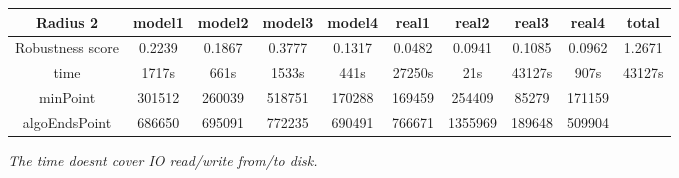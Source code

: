 \documentclass{article}
\begin{document}
\begin{table}[]
\begin{adjustwidth}{-1cm}{}
\begin{threeparttable}
\begin{tabular}{|c|c|c|c|c|c|c|c|c|c|}
				\textbf{Radius 2} & \textbf{model1} & \textbf{model2} & \textbf{model3} & \textbf{model4} & \textbf{real1} & \textbf{real2} & \textbf{real3} & \textbf{real4} & \textbf{total} \\ \hline
				Robustness score                 & 0.2239          & 0.1867          & 0.3777          & 0.1317          & 0.0482         & 0.0941         & 0.1085         & 0.0962         & 1.2671         \\ \hline
				time                             & 1717s           & 661s            & 1533s           & 441s            & 27250s         & 21s            & 43127s         & 907s           & 43127s         \\ \hline
				minPoint                         & 301512          & 260039          & 518751          & 170288          & 169459         & 254409         & 85279          & 171159         &                \\ \hline
				algoEndsPoint                    & 686650          & 695091          & 772235          & 690491          & 766671         & 1355969        & 189648         & 509904         &                \\ \hline
				
			\end{tabular}
			\begin{tablenotes}
				\small
				\item\textit{ The time doesn\textquotesingle t cover IO read/write from/to disk.}
				\end{tablenotes}			
			\end{threeparttable}
		\end{adjustwidth}	
	\end{table}
	
\end{document}
